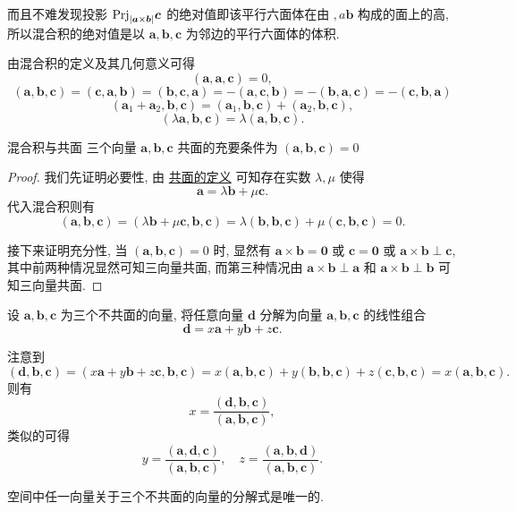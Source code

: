 \documentclass[cn,toc=twocol]{elegantbook}
\newcommand{\ve}[1]{\boldsymbol{#1}}
\newcommand{\vtimes}[2]{\ve{#1} \times \ve{#2}}
\begin{document}
而且不难发现投影 $\rm{Prj}_{\lvert \vtimes{a}{b} \rvert} \ve c$ 的绝对值即该平行六面体在由 $\ve, a \ve b$ 构成的面上的高, 所以混合积的绝对值是以 $\ve a, \ve b, \ve c$ 为邻边的平行六面体的体积.

由混合积的定义及其几何意义可得
\[
	(\ve a, \ve a , \ve c) = 0,
\]
\[
	(\ve a, \ve b, \ve c) = (\ve c, \ve a, \ve b) = (\ve b, \ve c , \ve a) = - (\ve a, \ve c, \ve b) = - (\ve b, \ve a , \ve c) = - (\ve c, \ve b , \ve a)
\]
\[
	(\ve a_1 + \ve a_2, \ve b, \ve c) = (\ve a_1, \ve b, \ve c) + (\ve a_2, \ve b, \ve c),
\]
\[
	(\lambda\ve a, \ve b, \ve c) = \lambda(\ve a, \ve b, \ve c).
\]

\begin{theorem}{混合积与共面}
	三个向量 $\ve a, \ve b, \ve c$ 共面的充要条件为 $(\ve a, \ve b, \ve c) = 0$
\end{theorem}
\begin{proof}
	我们先证明必要性, 由 \hyperref[def:coplanarity]{共面的定义} 可知存在实数 $\lambda,\mu$ 使得
	\[
		\ve a = \lambda\ve b + \mu\ve c.
	\]
	代入混合积则有
	\[
		(\ve a, \ve b, \ve c) = (\lambda\ve b + \mu\ve c, \ve b, \ve c) = \lambda(\ve b, \ve b, \ve c) + \mu(\ve c, \ve b, \ve c) = 0.
	\]
	
	接下来证明充分性, 当 $(\ve a, \ve b, \ve c) = 0$ 时, 显然有 $\vtimes{a}{b}= \ve 0$ 或 $\ve c = \ve 0$ 或 $\vtimes{a}{b} \perp \ve c$, 其中前两种情况显然可知三向量共面, 而第三种情况由 $\vtimes{a}{b} \perp \ve a$ 和 $\vtimes{a}{b} \perp \ve b$ 可知三向量共面.
\end{proof}

\begin{example}
	设 $\ve a, \ve b, \ve c$ 为三个不共面的向量, 将任意向量 $\ve d$ 分解为向量 $\ve a, \ve b, \ve c$ 的线性组合
	\[
		\ve d = x\ve a + y\ve b + z\ve c.
	\]
\end{example}

\begin{solution}
	注意到
	\[
		(\ve d, \ve b, \ve c) = (x\ve a + y\ve b + z\ve c, \ve b, \ve c) = x(\ve a, \ve b, \ve c) + y(\ve b, \ve b, \ve c) + z(\ve c, \ve b, \ve c) = x(\ve a, \ve b, \ve c).
	\]
	则有
	\[
		x = \frac{(\ve d, \ve b, \ve c)}{(\ve a, \ve b, \ve c)},
	\]
	类似的可得
	\[
		y = \frac{(\ve a, \ve d, \ve c)}{(\ve a, \ve b, \ve c)}, \quad z = \frac{(\ve a, \ve b, \ve d)}{(\ve a, \ve b, \ve c)}.
	\]
\end{solution}

\begin{corollary}
	空间中任一向量关于三个不共面的向量的分解式是唯一的.
\end{corollary}
\end{document}
